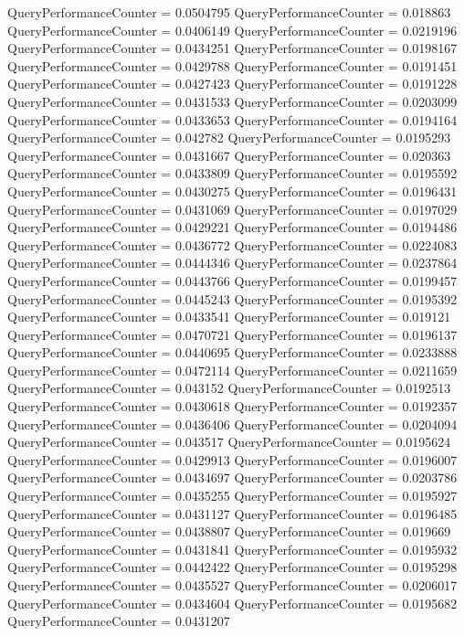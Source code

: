 \documentclass[9pt]{article}
\theoremstyle{plain}
\theoremstyle{definition}
\theoremstyle{remark}
\numberwithin{equation}{section}
\begin{document}
QueryPerformanceCounter  =  0.0504795
QueryPerformanceCounter  =  0.018863
QueryPerformanceCounter  =  0.0406149
QueryPerformanceCounter  =  0.0219196
QueryPerformanceCounter  =  0.0434251
QueryPerformanceCounter  =  0.0198167
QueryPerformanceCounter  =  0.0429788
QueryPerformanceCounter  =  0.0191451
QueryPerformanceCounter  =  0.0427423
QueryPerformanceCounter  =  0.0191228
QueryPerformanceCounter  =  0.0431533
QueryPerformanceCounter  =  0.0203099
QueryPerformanceCounter  =  0.0433653
QueryPerformanceCounter  =  0.0194164
QueryPerformanceCounter  =  0.042782
QueryPerformanceCounter  =  0.0195293
QueryPerformanceCounter  =  0.0431667
QueryPerformanceCounter  =  0.020363
QueryPerformanceCounter  =  0.0433809
QueryPerformanceCounter  =  0.0195592
QueryPerformanceCounter  =  0.0430275
QueryPerformanceCounter  =  0.0196431
QueryPerformanceCounter  =  0.0431069
QueryPerformanceCounter  =  0.0197029
QueryPerformanceCounter  =  0.0429221
QueryPerformanceCounter  =  0.0194486
QueryPerformanceCounter  =  0.0436772
QueryPerformanceCounter  =  0.0224083
QueryPerformanceCounter  =  0.0444346
QueryPerformanceCounter  =  0.0237864
QueryPerformanceCounter  =  0.0443766
QueryPerformanceCounter  =  0.0199457
QueryPerformanceCounter  =  0.0445243
QueryPerformanceCounter  =  0.0195392
QueryPerformanceCounter  =  0.0433541
QueryPerformanceCounter  =  0.019121
QueryPerformanceCounter  =  0.0470721
QueryPerformanceCounter  =  0.0196137
QueryPerformanceCounter  =  0.0440695
QueryPerformanceCounter  =  0.0233888
QueryPerformanceCounter  =  0.0472114
QueryPerformanceCounter  =  0.0211659
QueryPerformanceCounter  =  0.043152
QueryPerformanceCounter  =  0.0192513
QueryPerformanceCounter  =  0.0430618
QueryPerformanceCounter  =  0.0192357
QueryPerformanceCounter  =  0.0436406
QueryPerformanceCounter  =  0.0204094
QueryPerformanceCounter  =  0.043517
QueryPerformanceCounter  =  0.0195624
QueryPerformanceCounter  =  0.0429913
QueryPerformanceCounter  =  0.0196007
QueryPerformanceCounter  =  0.0434697
QueryPerformanceCounter  =  0.0203786
QueryPerformanceCounter  =  0.0435255
QueryPerformanceCounter  =  0.0195927
QueryPerformanceCounter  =  0.0431127
QueryPerformanceCounter  =  0.0196485
QueryPerformanceCounter  =  0.0438807
QueryPerformanceCounter  =  0.019669
QueryPerformanceCounter  =  0.0431841
QueryPerformanceCounter  =  0.0195932
QueryPerformanceCounter  =  0.0442422
QueryPerformanceCounter  =  0.0195298
QueryPerformanceCounter  =  0.0435527
QueryPerformanceCounter  =  0.0206017
QueryPerformanceCounter  =  0.0434604
QueryPerformanceCounter  =  0.0195682
QueryPerformanceCounter  =  0.0431207
\end{document}
